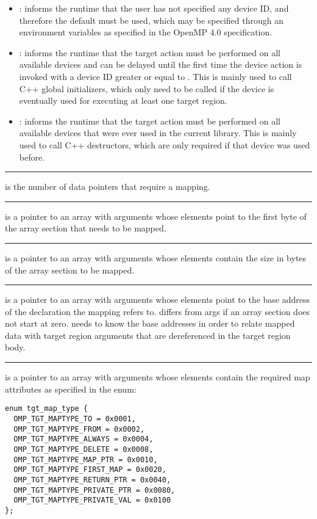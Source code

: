 \begin{itemize}
  \item {}: informs the runtime that the user has not specified any device ID, and therefore the default must be used, which may be specified through an environment variables as specified in the OpenMP 4.0 specification.

  \item {}: informs the runtime that the target action must be performed on all available devices and can be delayed until the first time the device action is invoked with a device ID greater or equal to . This is mainly used to call C++ global initializers, which only need to be called if the device is eventually used for executing at least one target region.

  \item {}: informs the runtime that the target action must be performed on all available devices that were ever used in the current library. This is mainly used to call C++ destructors, which are only required if that device was used before.
\end{itemize}

\noindent\rule{\textwidth}{0.4pt}

 is the number of data pointers that require a mapping.

\noindent\rule{\textwidth}{0.4pt}

 is a pointer to an array with  arguments whose elements point to the first byte of the array section that needs to be mapped.

\noindent\rule{\textwidth}{0.4pt}

 is a pointer to an array with  arguments whose elements contain the size in bytes of the array section to be mapped.

\noindent\rule{\textwidth}{0.4pt}

 is a pointer to an array with  arguments whose elements point to the base address of the declaration the mapping refers to.  differs from args if an array section does not start at zero. \libomptarget{} needs to know the base addresses in order to relate mapped data with target region arguments that are dereferenced in the target region body.

\noindent\rule{\textwidth}{0.4pt}

 is a pointer to an array with  arguments whose elements contain the required map attributes as specified in the enum:
\begin{lstlisting}
enum tgt_map_type {
  OMP_TGT_MAPTYPE_TO = 0x0001,
  OMP_TGT_MAPTYPE_FROM = 0x0002,
  OMP_TGT_MAPTYPE_ALWAYS = 0x0004,
  OMP_TGT_MAPTYPE_DELETE = 0x0008,
  OMP_TGT_MAPTYPE_MAP_PTR = 0x0010,
  OMP_TGT_MAPTYPE_FIRST_MAP = 0x0020,
  OMP_TGT_MAPTYPE_RETURN_PTR = 0x0040,
  OMP_TGT_MAPTYPE_PRIVATE_PTR = 0x0080,
  OMP_TGT_MAPTYPE_PRIVATE_VAL = 0x0100
};
\end{lstlisting}

